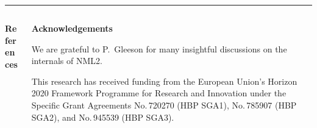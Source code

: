 \documentclass{beamer}
\begin{document}
\begin{frame}[t, fragile]
  \vspace*{1ex}
  \textcolor{arbgrey}{\rule{\textwidth}{0.5ex}}
  \vspace*{-1ex}
  \begin{columns}
    \begin{column}{0.49\textwidth}
      \textbf{References}

      \printbibliography[type=article]
    \end{column}
    \begin{column}{0.49\textwidth}
      \printbibliography[nottype=article]

      \textbf{Acknowledgements}

      We are grateful to P.~Gleeson for many insightful discussions on the
      internals of NML2.

      This research has received funding from the European Union's Horizon 2020
      Framework Programme for Research and Innovation under the Specific Grant
      Agreements No.\,720270 (HBP SGA1), No.\,785907 (HBP SGA2), and No.\,945539
      (HBP SGA3).
    \end{column}
  \end{columns}
\end{frame}
\end{document}
